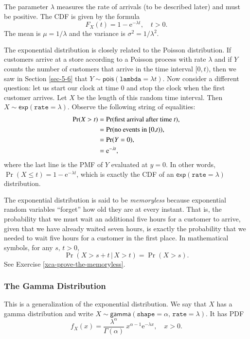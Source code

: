 \documentclass[captions=tableheading]{scrbook}
\begin{document}
The parameter \(\lambda\) measures the rate of arrivals (to be described later) and must be positive. The CDF is given by the formula
\begin{equation}
F_{X}(t)=1-\mathrm{e}^{-\lambda t},\quad t>0.
\end{equation}
The mean is \(\mu=1/\lambda\) and the variance is \(\sigma^{2}=1/\lambda^{2}\). 

The exponential distribution is closely related to the Poisson distribution. If customers arrive at a store according to a Poisson process with rate \(\lambda\) and if \(Y\) counts the number of customers that arrive in the time interval \([0,t)\), then we saw in Section \ref{sec-5-6} that \( Y \sim \mathsf{pois}(\mathtt{lambda}=\lambda t). \) Now consider a different question: let us start our clock at time 0 and stop the clock when the first customer arrives. Let \(X\) be the length of this random time interval. Then \(X\sim\mathsf{exp}(\mathtt{rate}=\lambda)\). Observe the following string of equalities:
\begin{align*}
\Pr(X>t) & =\Pr(\mbox{first arrival after time \emph{t}}),\\
 & =\Pr(\mbox{no events in [0,\emph{t})}),\\
 & =\Pr(Y=0),\\
 & =\mathrm{e}^{-\lambda t},
\end{align*}
where the last line is the PMF of \(Y\) evaluated at \(y=0\). In other words, \(\Pr(X\leq t)=1-\mathrm{e}^{-\lambda t}\), which is exactly the CDF of an \(\mathsf{exp}(\mathtt{rate}=\lambda)\) distribution. 

The exponential distribution is said to be \emph{memoryless} because exponential random variables ``forget'' how old they are at every instant. That is, the probability that we must wait an additional five hours for a customer to arrive, given that we have already waited seven hours, is exactly the probability that we needed to wait five hours for a customer in the first place. In mathematical symbols, for any \(s,\, t>0\),
\begin{equation}
\Pr(X>s+t\,|\, X>t)=\Pr(X>s).
\end{equation}
See Exercise \ref{xca-prove-the-memoryless}.
\subsubsection{The Gamma Distribution}
\label{sec-6-5-1-2}
\label{sub-The-Gamma-Distribution}


This is a generalization of the exponential distribution. We say that \(X\) has a gamma distribution and write \(X\sim\mathsf{gamma}(\mathtt{shape}=\alpha,\,\mathtt{rate}=\lambda)\). It has PDF
\begin{equation}
f_{X}(x)=\frac{\lambda^{\alpha}}{\Gamma(\alpha)}\: x^{\alpha-1}\mathrm{e}^{-\lambda x},\quad x>0.
\end{equation}
\end{document}
